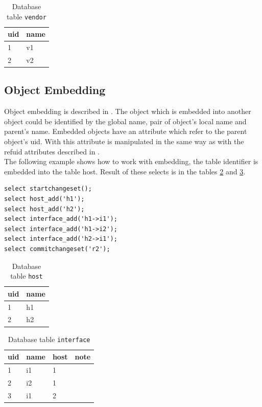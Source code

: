 \documentclass[deska]{subfiles}
\begin{document}
\begin{longtable}{ l | l }
    \caption{Database table {\tt vendor}}\\
    uid & name \\
    \hline
    \endhead
\label{tab:refs-vendor}
    1 & v1\\
    2 & v2\\
    \hline
\end{longtable}


\subsection{Object Embedding}
Object embedding is described in . The object which is embedded into another object could be identified by the global name, pair of object's local name and parent's name. Embedded objects have an attribute which refer to the parent object's uid. With this attribute is manipulated in the same way as with the refuid attributes described in .\\
The following example shows how to work with embedding, the table identifier is embedded into the table host. Result of these selects is in the tables \ref{tab:embed-host} and \ref{tab:embed-interface}.

\begin{verbatim}
select startchangeset();
select host_add('h1');
select host_add('h2');
select interface_add('h1->i1');
select interface_add('h1->i2');
select interface_add('h2->i1');
select commitchangeset('r2');
\end{verbatim}

\begin{longtable}{ l | l }
    \caption{Database table {\tt host}}\\
    uid & name \\
    \hline
    \endhead
\label{tab:embed-host}
    1 & h1\\
    2 & h2\\
    \hline
\end{longtable}

\begin{longtable}{ l | l | l | l }
    \caption{Database table {\tt interface}}\\
    uid & name & host & note\\
    \hline
    \endhead
\label{tab:embed-interface}
    1 & i1 & 1 & \\
    2 & i2 & 1 & \\
    3 & i1 & 2 & \\
    \hline
\end{longtable}
\end{document}
